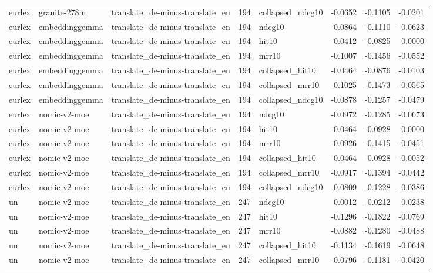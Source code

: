 \begin{tabular}{lllrlrrr}
eurlex & granite-278m & translate\_de-minus-translate\_en & 194 & collapsed\_ndcg10 & -0.0652 & -0.1105 & -0.0201 \\
eurlex & embeddinggemma & translate\_de-minus-translate\_en & 194 & ndcg10 & -0.0864 & -0.1110 & -0.0623 \\
eurlex & embeddinggemma & translate\_de-minus-translate\_en & 194 & hit10 & -0.0412 & -0.0825 & 0.0000 \\
eurlex & embeddinggemma & translate\_de-minus-translate\_en & 194 & mrr10 & -0.1007 & -0.1456 & -0.0552 \\
eurlex & embeddinggemma & translate\_de-minus-translate\_en & 194 & collapsed\_hit10 & -0.0464 & -0.0876 & -0.0103 \\
eurlex & embeddinggemma & translate\_de-minus-translate\_en & 194 & collapsed\_mrr10 & -0.1025 & -0.1473 & -0.0565 \\
eurlex & embeddinggemma & translate\_de-minus-translate\_en & 194 & collapsed\_ndcg10 & -0.0878 & -0.1257 & -0.0479 \\
eurlex & nomic-v2-moe & translate\_de-minus-translate\_en & 194 & ndcg10 & -0.0972 & -0.1285 & -0.0673 \\
eurlex & nomic-v2-moe & translate\_de-minus-translate\_en & 194 & hit10 & -0.0464 & -0.0928 & 0.0000 \\
eurlex & nomic-v2-moe & translate\_de-minus-translate\_en & 194 & mrr10 & -0.0926 & -0.1415 & -0.0451 \\
eurlex & nomic-v2-moe & translate\_de-minus-translate\_en & 194 & collapsed\_hit10 & -0.0464 & -0.0928 & -0.0052 \\
eurlex & nomic-v2-moe & translate\_de-minus-translate\_en & 194 & collapsed\_mrr10 & -0.0917 & -0.1394 & -0.0442 \\
eurlex & nomic-v2-moe & translate\_de-minus-translate\_en & 194 & collapsed\_ndcg10 & -0.0809 & -0.1228 & -0.0386 \\
un & nomic-v2-moe & translate\_de-minus-translate\_en & 247 & ndcg10 & 0.0012 & -0.0212 & 0.0238 \\
un & nomic-v2-moe & translate\_de-minus-translate\_en & 247 & hit10 & -0.1296 & -0.1822 & -0.0769 \\
un & nomic-v2-moe & translate\_de-minus-translate\_en & 247 & mrr10 & -0.0882 & -0.1280 & -0.0488 \\
un & nomic-v2-moe & translate\_de-minus-translate\_en & 247 & collapsed\_hit10 & -0.1134 & -0.1619 & -0.0648 \\
un & nomic-v2-moe & translate\_de-minus-translate\_en & 247 & collapsed\_mrr10 & -0.0796 & -0.1181 & -0.0420 \\

\end{tabular}
